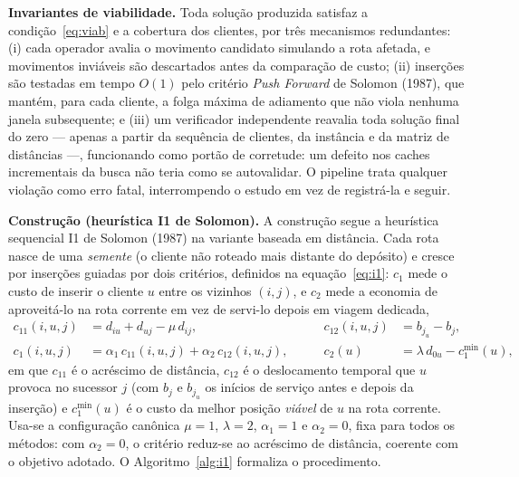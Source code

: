 \documentclass[10pt,a4paper]{article}
\begin{document}
\vspace{\baselineskip}
\textbf{Invariantes de viabilidade.} Toda solução produzida satisfaz a condição~\eqref{eq:viab} e a cobertura dos clientes, por três mecanismos redundantes: (i) cada operador avalia o movimento candidato simulando a rota afetada, e movimentos inviáveis são descartados antes da comparação de custo; (ii) inserções são testadas em tempo $O(1)$ pelo critério \textit{Push Forward} de Solomon (1987), que mantém, para cada cliente, a folga máxima de adiamento que não viola nenhuma janela subsequente; e (iii) um verificador independente reavalia toda solução final do zero --- apenas a partir da sequência de clientes, da instância e da matriz de distâncias ---, funcionando como portão de corretude: um defeito nos caches incrementais da busca não teria como se autovalidar. O pipeline trata qualquer violação como erro fatal, interrompendo o estudo em vez de registrá-la e seguir.

\vspace{\baselineskip}
\textbf{Construção (heurística I1 de Solomon).} A construção segue a heurística sequencial I1 de Solomon (1987) na variante baseada em distância. Cada rota nasce de uma \emph{semente} (o cliente não roteado mais distante do depósito) e cresce por inserções guiadas por dois critérios, definidos na equação~\eqref{eq:i1}: $c_1$ mede o custo de inserir o cliente $u$ entre os vizinhos $(i,j)$, e $c_2$ mede a economia de aproveitá-lo na rota corrente em vez de servi-lo depois em viagem dedicada,
\begin{equation}
\begin{aligned}
c_{11}(i,u,j) &= d_{iu}+d_{uj}-\mu\,d_{ij}, &\qquad c_{12}(i,u,j) &= b_{j_u}-b_{j},\\
c_{1}(i,u,j) &= \alpha_1\,c_{11}(i,u,j)+\alpha_2\,c_{12}(i,u,j), &\qquad c_{2}(u) &= \lambda\,d_{0u}-c_1^{\min}(u),
\end{aligned}
\label{eq:i1}
\end{equation}
em que $c_{11}$ é o acréscimo de distância, $c_{12}$ é o deslocamento temporal que $u$ provoca no sucessor $j$ (com $b_j$ e $b_{j_u}$ os inícios de serviço antes e depois da inserção) e $c_1^{\min}(u)$ é o custo da melhor posição \emph{viável} de $u$ na rota corrente. Usa-se a configuração canônica $\mu=1$, $\lambda=2$, $\alpha_1=1$ e $\alpha_2=0$, fixa para todos os métodos: com $\alpha_2=0$, o critério reduz-se ao acréscimo de distância, coerente com o objetivo adotado. O Algoritmo~\ref{alg:i1} formaliza o procedimento.
\end{document}
